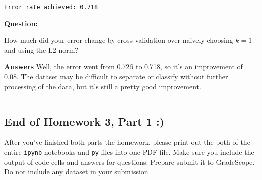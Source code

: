 \documentclass[11pt]{article}
\begin{document}
    \begin{Verbatim}[commandchars=\\\{\}]
Error rate achieved: 0.718

    \end{Verbatim}

    \textbf{Question:}

How much did your error change by cross-validation over naively choosing
\(k=1\) and using the L2-norm?

    \textbf{Answers} Well, the error went from 0.726 to 0.718, so it's an
improvement of 0.08. The dataset may be difficult to separate or
classify without further processing of the data, but it's still a pretty
good improvement.

    \begin{center}\rule{0.5\linewidth}{0.5pt}\end{center}

    \hypertarget{end-of-homework-3-part-1}{%
\subsection{End of Homework 3, Part 1
:)}\label{end-of-homework-3-part-1}}

After you've finished both parts the homework, please print out the both
of the entire \texttt{ipynb} notebooks and \texttt{py} files into one
PDF file. Make sure you include the output of code cells and answers for
questions. Prepare submit it to GradeScope. Do not include any dataset
in your submission.


    
    
    
    
\end{document}
